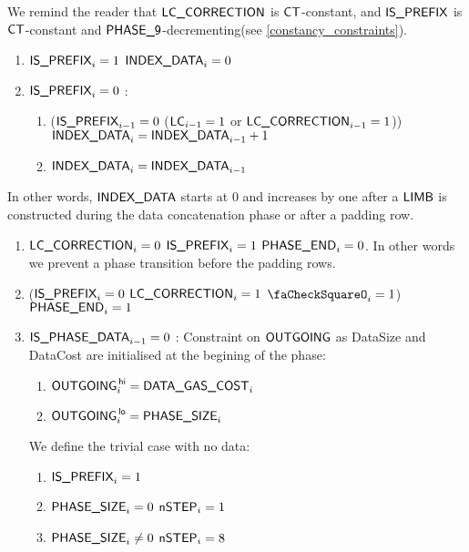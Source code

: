 \begin{center}
\end{center}

We remind the reader that $\textsf{LC\_CORRECTION}$ is $\textsf{CT}$-constant, and $\textsf{IS\_PREFIX}$ is $\textsf{CT}$-constant and $\textsf{PHASE\_9}$-decrementing(see \ref{constancy_constraints}).
\begin{enumerate}
    \item \If $\textsf{IS\_PREFIX}_{i}=1$ \Then $\textsf{INDEX\_DATA}_{i}=0$
    \item \If $\textsf{IS\_PREFIX}_{i}=0$ \Then: 
    \begin{enumerate}
        \item \If ($\textsf{IS\_PREFIX}_{i-1}=0$ \et ($\textsf{LC}_{i-1}=1$ or $\textsf{LC\_CORRECTION}_{i-1}=1$)) \Then $\textsf{INDEX\_DATA}_{i}=\textsf{INDEX\_DATA}_{i-1} + 1$
        \item \Else $\textsf{INDEX\_DATA}_{i}=\textsf{INDEX\_DATA}_{i-1}$
    \end{enumerate}
\end{enumerate}
In other words, $\textsf{INDEX\_DATA}$ starts at 0 and increases by one after a $\textsf{LIMB}$ is constructed during the data concatenation phase or after a padding row. %
\begin{enumerate}[resume]
    \item \If $\textsf{LC\_CORRECTION}_{i} = 0$ \Or $\textsf{IS\_PREFIX}_{i}=1$ \Then $\textsf{PHASE\_END}_{i}=0$. In other words we prevent a phase transition before the padding rows.
    \item \If ($\textsf{IS\_PREFIX}_{i}=0$ \et $\textsf{LC\_CORRECTION}_{i} = 1$ \et $\done_{i}=1$) \Then $\textsf{PHASE\_END}_{i}=1$
    \item \If $\textsf{IS\_PHASE\_DATA}_{i-1}=0$ \Then:
    Constraint on $\textsf{OUTGOING}$ as DataSize and DataCost are initialised at the begining of the phase:
    \begin{enumerate}
        \item $\textsf{OUTGOING}^{\mathsf{\,hi}}_{i}=\textsf{DATA\_GAS\_COST}_{i}$
        \item $\textsf{OUTGOING}^{\mathsf{\,lo}}_{i}=\textsf{PHASE\_SIZE}_{i}$
    \end{enumerate} 
    We define the trivial case with no data:
    \begin{enumerate}[resume]
        \item $\textsf{IS\_PREFIX}_{i}=1$
        \item \If $\textsf{PHASE\_SIZE}_{i}=0$ \Then $\textsf{nSTEP}_{i}=1$
        \item \If $\textsf{PHASE\_SIZE}_{i} \ne 0$ \Then $\textsf{nSTEP}_{i}=8$ 
    \end{enumerate}
\end{enumerate}

